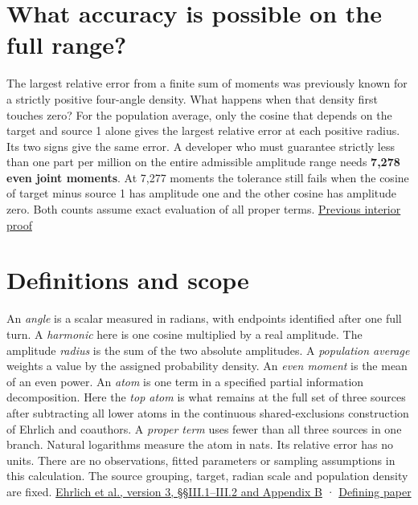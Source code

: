 \section{What accuracy is possible on the full range?}\label{what-accuracy-is-possible-on-the-full-range}

The largest relative error from a finite sum of moments was previously known for a strictly positive four-angle density. What happens when that density first touches zero? For the population average, only the cosine that depends on the target and source 1 alone gives the largest relative error at each positive radius. Its two signs give the same error. A developer who must guarantee strictly less than one part per million on the entire admissible amplitude range needs \textbf{7,278 even joint moments}. At 7,277 moments the tolerance still fails when the cosine of target minus source 1 has amplitude one and the other cosine has amplitude zero. Both counts assume exact evaluation of all proper terms. \href{https://github.com/sepahead/pid-rs/blob/ef705d1ed3410fd9fbbf4920cb4643f6a5140a2f/audit/research/angular-truncation-extremum/EXPOSITION.md}{Previous interior proof}

\section{Definitions and scope}\label{definitions-and-scope}

An \emph{angle} is a scalar measured in radians, with endpoints identified after one full turn. A \emph{harmonic} here is one cosine multiplied by a real amplitude. The amplitude \emph{radius} is the sum of the two absolute amplitudes. A \emph{population average} weights a value by the assigned probability density. An \emph{even moment} is the mean of an even power. An \emph{atom} is one term in a specified partial information decomposition. Here the \emph{top atom} is what remains at the full set of three sources after subtracting all lower atoms in the continuous shared-exclusions construction of Ehrlich and coauthors. A \emph{proper term} uses fewer than all three sources in one branch. Natural logarithms measure the atom in nats. Its relative error has no units. There are no observations, fitted parameters or sampling assumptions in this calculation. The source grouping, target, radian scale and population density are fixed. \href{https://arxiv.org/html/2311.06373v3\#S3.SS2}{Ehrlich et al., version 3, §§III.1--III.2 and Appendix B} · \href{https://doi.org/10.1103/PhysRevE.110.014115}{Defining paper}

